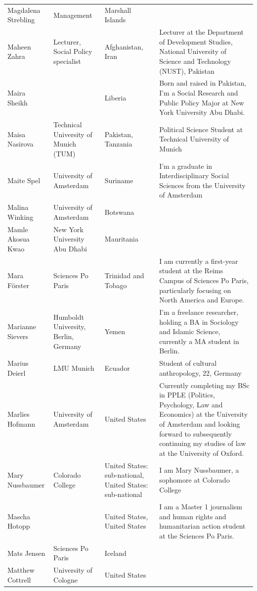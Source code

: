 \documentclass[
]{article}
\begin{document}
\begin{longtable}[t]{l>{\raggedright\arraybackslash}p{2cm}>{\raggedright\arraybackslash}p{2cm}>{\raggedright\arraybackslash}p{3cm}}
Magdalena Strebling & Management & Marshall Islands & \\
\rowcolor{gray!6}  Maheen Zahra & Lecturer, Social Policy specialist & Afghanistan, Iran & Lecturer at the Department of Development Studies, National University of Science and Technology (NUST), Pakistan\\
Maira Sheikh &  & Liberia & Born and raised in Pakistan, I'm a Social Research and Public Policy Major at New York University Abu Dhabi.\\
\rowcolor{gray!6}  Maisa Nasirova & Technical University of Munich (TUM) & Pakistan, Tanzania & Political Science Student at Technical University of Munich\\
\addlinespace
Maite Spel & University of Amsterdam & Suriname & I'm a graduate in Interdisciplinary Social Sciences from the University of Amsterdam\\
\rowcolor{gray!6}  Malina Winking & University of Amsterdam & Botswana & \\
Mamle Akosua Kwao & New York University Abu Dhabi & Mauritania & \\
\rowcolor{gray!6}  Mara Förster & Sciences Po Paris & Trinidad and Tobago & I am currently a first-year student at the Reims Campus of Sciences Po Paris, particularly focusing on North America and Europe.\\
Marianne Sievers & Humboldt University, Berlin, Germany & Yemen & I'm a freelance researcher, holding a BA in Sociology and Islamic Science, currently a MA student in Berlin.\\
\addlinespace
\rowcolor{gray!6}  Marius Deierl & LMU Munich & Ecuador & Student of cultural anthropology, 22, Germany\\
Marlies Hofmann & University of Amsterdam & United States & Currently completing my BSc in PPLE (Politics, Psychology, Law and Economics) at the University of Amsterdam and looking forward to subsequently continuing my studies of law at the University of Oxford.\\
\rowcolor{gray!6}  Mary Nussbaumer & Colorado College & United States: sub-national, United States: sub-national & I am Mary Nussbaumer, a sophomore at Colorado College\\
Mascha Hotopp &  & United States, United States & I am a Master 1 journalism and human rights and humanitarian action student at the Sciences Po Paris.\\
\rowcolor{gray!6}  Mats Jensen & Sciences Po Paris & Iceland & \\
\addlinespace
Matthew Cottrell & University of Cologne & United States & \\

\end{longtable}
\end{document}
